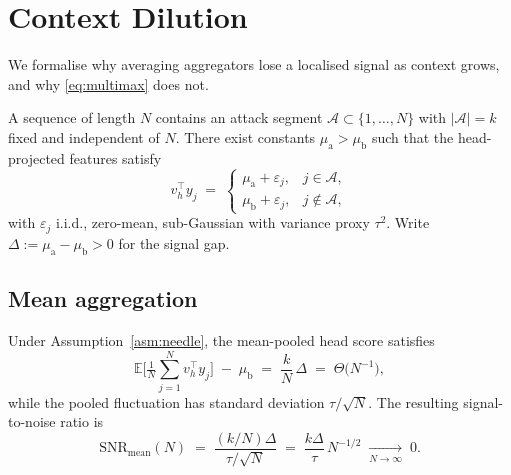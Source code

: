 \section{Context Dilution}
\label{sec:dilution}

We formalise why averaging aggregators lose a localised signal as context grows, and why
\eqref{eq:multimax} does not.

\begin{assumption}
\label{asm:needle}
A sequence of length $N$ contains an attack segment $\mathcal{A}\subset\{1,\dots,N\}$
with $|\mathcal{A}|=k$ fixed and independent of $N$. There exist constants
$\mu_{\mathrm{a}}>\mu_{\mathrm{b}}$ such that the head-projected features satisfy
\begin{equation}
  v_h^\top y_{j} \;=\;
  \begin{cases}
    \mu_{\mathrm{a}} + \varepsilon_j, & j\in\mathcal{A},\\
    \mu_{\mathrm{b}} + \varepsilon_j, & j\notin\mathcal{A},
  \end{cases}
  \label{eq:needle-model}
\end{equation}
with $\varepsilon_j$ i.i.d., zero-mean, sub-Gaussian with variance proxy $\tau^2$.
Write $\Delta:=\mu_{\mathrm{a}}-\mu_{\mathrm{b}}>0$ for the signal gap.
\end{assumption}

\subsection{Mean aggregation}

\begin{proposition}
\label{prop:mean}
Under Assumption~\ref{asm:needle}, the mean-pooled head score satisfies
\begin{equation}
  \mathbb{E}\Big[\tfrac{1}{N}\textstyle\sum_{j=1}^{N} v_h^\top y_j\Big]
    \;-\;\mu_{\mathrm{b}}
  \;=\; \frac{k}{N}\,\Delta \;=\; \Theta\!\big(N^{-1}\big),
  \label{eq:mean-dilution}
\end{equation}
while the pooled fluctuation has standard deviation $\tau/\sqrt{N}$. The resulting
signal-to-noise ratio is
\begin{equation}
  \mathrm{SNR}_{\mathrm{mean}}(N)
  \;=\;\frac{(k/N)\Delta}{\tau/\sqrt{N}}
  \;=\;\frac{k\Delta}{\tau}\,N^{-1/2}
  \;\xrightarrow[N\to\infty]{}\;0 .
  \label{eq:mean-snr}
\end{equation}
\end{proposition}

